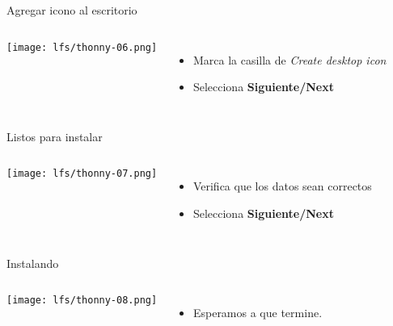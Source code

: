 \begin{frame}[c]{Agregar icono al escritorio}
    \begin{columns}
        \begin{center}
            \texttt{[image: lfs/thonny-06.png]}
        \end{center}
        \begin{itemize}
          \item Marca la casilla de \emph{Create desktop icon}
          \item Selecciona \textbf{Siguiente/Next}
        \end{itemize}
    \end{columns}
\end{frame}

\begin{frame}[c]{Listos para instalar}
    \begin{columns}
        \begin{center}
            \texttt{[image: lfs/thonny-07.png]}
        \end{center}
        \begin{itemize}
          \item Verifica que los datos sean correctos
          \item Selecciona \textbf{Siguiente/Next}
        \end{itemize}
    \end{columns}
\end{frame}

\begin{frame}[c]{Instalando}
    \begin{columns}
        \begin{center}
            \texttt{[image: lfs/thonny-08.png]}
        \end{center}
        \begin{itemize}
          \item Esperamos a que termine.
        \end{itemize}
    \end{columns}
\end{frame}

